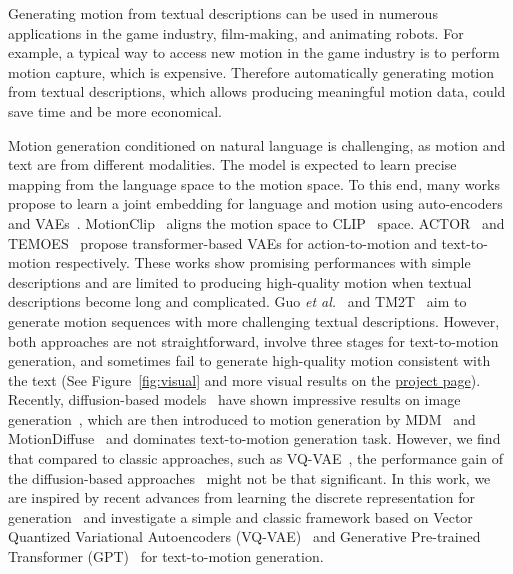 \documentclass[10pt,twocolumn,letterpaper]{article}
\begin{document}
Generating motion from textual descriptions can be used in numerous applications in the game industry, film-making, and animating robots. For example, a typical way to access new motion in the game industry is to perform motion capture, which is expensive. Therefore automatically generating motion from textual descriptions, which allows producing meaningful motion data, could save time and be more economical. 

Motion generation conditioned on natural language is challenging, as motion and text are from different modalities. The model is expected to learn precise mapping from the language space to the motion space. To this end, many works propose to learn a joint embedding for language and motion using auto-encoders~\cite{ahuja2019language2pose, ghosh2021synthesis, tevet2022motionclip} and VAEs~\cite{petrovich21actor,petrovich22temos}. MotionClip~\cite{tevet2022motionclip} aligns the motion space to CLIP~\cite{radford2021learning} space. ACTOR~\cite{petrovich21actor} and TEMOES~\cite{petrovich22temos} propose transformer-based VAEs for action-to-motion and text-to-motion respectively. These works show promising performances with simple descriptions and are limited to producing high-quality motion when textual descriptions become long and complicated. Guo \textit{et al.}~\cite{guo2022generating} and TM2T~\cite{chuan2022tm2t} aim to generate motion sequences with more challenging textual descriptions. However, both approaches are not straightforward, involve three stages for text-to-motion generation, and sometimes fail to generate high-quality motion consistent with the text (See Figure~\ref{fig:visual} and more visual results on the \href{https://mael-zys.github.io/T2M-GPT/}{project page}). 
Recently, diffusion-based models~\cite{ho2020denoising} have shown impressive results on image generation~\cite{rombach2022high}, which are then introduced to motion generation by MDM~\cite{tevet2022MDM} and MotionDiffuse~\cite{zhang2022motiondiffuse} and dominates text-to-motion generation task. However, we find that compared to classic approaches, such as VQ-VAE~\cite{van2017neural}, the performance gain of the diffusion-based approaches~\cite{zhang2022motiondiffuse,tevet2022MDM} might not be that significant. 
In this work, we are inspired by recent advances from learning the discrete representation for generation~\cite{van2017neural,williams2020hierarchical,esser2021taming,ramesh2021zero,ao2022rhythmic,dieleman2018challenge,dhariwal2020jukebox,posegpt} and investigate a simple and classic framework based on Vector Quantized Variational Autoencoders (VQ-VAE)~\cite{van2017neural} and Generative Pre-trained Transformer (GPT)~\cite{vaswani2017attention,radford2018improving} for text-to-motion generation.
\end{document}
